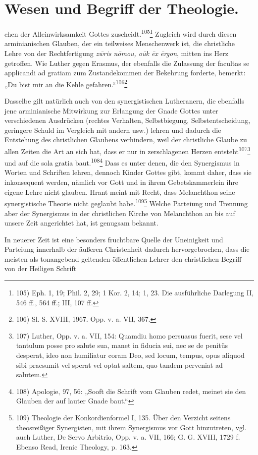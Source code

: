 \setcounter{page}{31}\section*{Wesen und Begriff der Theologie.}\par chen der Alleinwirksamkeit Gottes zuscheidt.\textsuperscript{105}\footnote{105) Eph. 1, 19; Phil. 2, 29; 1 Kor. 2, 14; 1, 23. Die ausführliche Darlegung II, 546 ff., 564 ff.; III, 107 ff.} Zugleich wird durch diesen arminianischen Glauben, der ein teilweises Menschenwerk ist, die christliche Lehre von der Rechtfertigung \emph{z\={w}ris n\={o}mou, o\={u}k \={e}x \={e}rgon}, mitten ins Herz getroffen. Wie Luther gegen Erasmus, der ebenfalls die Zulassung der facultas se applicandi ad gratiam zum Zustandekommen der Bekehrung forderte, bemerkt: „Du bist mir an die Kehle gefahren.“\textsuperscript{106}\footnote{106) Sl. S. XVIII, 1967. Opp. v. a. VII, 367.}\par Dasselbe gilt natürlich auch von den synergistischen Lutheranern, die ebenfalls jene arminianische Mitwirkung zur Erlangung der Gnade Gottes unter verschiedenen Ausdrücken (rechtes Verhalten, Selbstbiegung, Selbstentscheidung, geringere Schuld im Vergleich mit andern usw.) lehren und dadurch die Entstehung des christlichen Glaubens verhindern, weil der christliche Glaube zu allen Zeiten die Art an sich hat, dass er nur in zerschlagenen Herzen entsteht\textsuperscript{107}\footnote{107) Luther, Opp. v. a. VII, 154: Quamdiu homo persuasus fuerit, sese vel tantulum posse pro salute sua, manet in fiducia sui, nec se de penitüs desperat, ideo non humiliatur coram Deo, sed locum, tempus, opus aliquod sibi praesumit vel sperat vel optat saltem, quo tandem perveniat ad salutem.} und auf die sola gratia baut.\textsuperscript{108}\footnote{108) Apologie, 97, 56: „Sooft die Schrift vom Glauben redet, meinet sie den Glauben der auf lauter Gnade baut.“} Dass es unter denen, die den Synergismus in Worten und Schriften lehren, dennoch Kinder Gottes gibt, kommt daher, dass sie inkonsequent werden, nämlich vor Gott und in ihrem Gebetskammerlein ihre eigene Lehre nicht glauben. Hrant meint mit Recht, dass Melanchthon seine synergistische Theorie nicht geglaubt habe.\textsuperscript{109}\footnote{109) Theologie der Konkordienformel I, 135. Über den Verzicht seitens theosreißiger Synergisten, mit ihrem Synergismus vor Gott hinzutreten, vgl. auch Luther, De Servo Arbitrio, Opp. v. a. VII, 166; G. G. XVIII, 1729 f. Ebenso Read, Irenic Theology, p. 163.} Welche Parteiung und Trennung aber der Synergismus in der christlichen Kirche von Melanchthon an bis auf unsere Zeit angerichtet hat, ist genugsam bekannt.\par In neuerer Zeit ist eine besonders fruchtbare Quelle der Uneinigkeit und Parteiung innerhalb der äußeren Christenheit dadurch hervorgebrochen, dass die meisten als tonangebend geltenden öffentlichen Lehrer den christlichen Begriff von der Heiligen Schrift